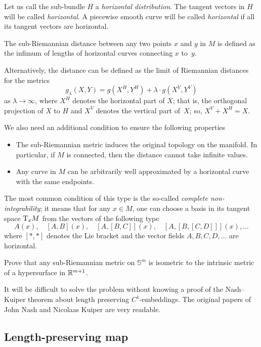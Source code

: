 Let us call the sub-bundle $H$ a \emph{horizontal distribution}.
The tangent vectors in $H$ will be called {}\emph{horizontal}.
A piecewise smooth curve will be called {}\emph{horizontal} if all its tangent vectors are horizontal.

The sub-Riemannian distance between any two points $x$ and $y$ in $M$ is defined as the infimum of lengths of horizontal curves connecting $x$ to~$y$.

Alternatively, the distance can be defined as the limit of Riemannian distances for the metrics
\[g_\lambda(X,Y)=g(X^H,Y^H)+\lambda\cdot g(X^V,Y^V)\] 
as $\lambda\to \infty$, where $X^H$ denotes the horizontal part of $X$;
that is, the orthogonal projection of $X$ to $H$ and $X^V$ denotes the vertical part of~$X$;
so, $X^V+X^H=X$.

We also need an additional condition to ensure the following properties 
\begin{itemize}
\item The sub-Riemannian metric induces the original topology on the manifold. 
In particular, if $M$ is connected, then the distance cannot take infinite values.
\item Any curve in $M$ can be arbitrarily well approximated by a horizontal curve with the same endpoints.
\end{itemize}
The most common condition of this type is the so-called {}\emph{complete non-integrability};
it means that for any $x\in M$, one can choose a basis in its tangent space $\mathrm{T}_xM$
from the vectors of the following type
\[A(x),\quad [A,B](x),\quad [A,[B,C]](x),\quad [A,[B,[C,D]]](x),\ldots\]
where $[{*},{*}]$ denotes the Lie bracket 
and the vector fields $A,B,C,D, \ldots$ are horizontal.

\begin{pr}
Prove that any sub-Riemannian metric on $\mathbb{S}^m$ is isometric to the intrinsic metric of a hypersurface in $\mathbb{R}^{m+1}$.
\end{pr}

It will be difficult to solve the problem without knowing a proof of the Nash--Kuiper theorem about length preserving $C^1$-embeddings.
The original papers of John Nash and Nicolaas Kuiper \cite{nash,kuiper} are very readable.

\subsection*{Length-preserving map\thm}
\label{two2one} 


